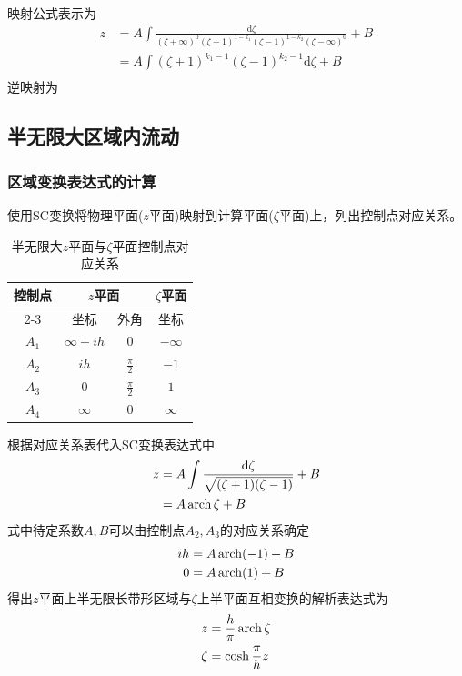 映射公式表示为
\begin{align}
    z&=A\int\frac{\mathrm{d}\zeta}{(\zeta+\infty)^{0}(\zeta+1)^{1-k_{1}}(\zeta-1)^{1-k_{2}}(\zeta-\infty)^{0}}+B\\
    &=A\int(\zeta+1)^{k_{1}-1}(\zeta-1)^{k_{2}-1}\mathrm{d}\zeta+B\\
\end{align}
逆映射为

\subsection{半无限大区域内流动}
\subsubsection{区域变换表达式的计算}
使用SC变换将物理平面($z$平面)映射到计算平面($\zeta$平面)上，列出控制点对应关系。
\begin{table}[htbp] 
    \centering
    \caption{半无限大$z$平面与$\zeta$平面控制点对应关系}
    \label{tab:optimized-mapping}
    \begin{tabular}{cccc}
        \toprule
        控制点 & \multicolumn{2}{c}{$z$平面} & $\zeta$平面 \\
        \cmidrule(lr){2-3} %
                         & 坐标 & 外角 & 坐标 \\
        \midrule
        $A_{1}$ & $\infty+ih$     & $0$                 & $-\infty$ \\
        $A_{2}$ & $ih$            & $\frac{\pi}{2}$       & $-1$      \\
        $A_{3}$ & $0$             & $\frac{\pi}{2}$       & $1$       \\
        $A_{4}$ & $\infty$        & $0$                 & $\infty$  \\
        \bottomrule
    \end{tabular}
\end{table}
根据对应关系表代入SC变换表达式中
\begin{align}
    z&=A\int \frac{\mathrm{d}\zeta}{\sqrt{(\zeta+1)(\zeta-1)}}+B\notag\\
    &=A\operatorname{arch} \zeta +B
\end{align}
式中待定系数$A,B$可以由控制点$A_{2},A_{3}$的对应关系确定
\begin{align}
    ih&=A\operatorname{arch}(-1)+B\\
    0&=A\operatorname{arch}(1)+B
\end{align}
得出$z$平面上半无限长带形区域与$\zeta$上半平面互相变换的解析表达式为
\begin{align}
    z&=\frac{h}{\pi}\operatorname{arch}\zeta\\
    \zeta&=\cosh\frac{\pi}{h}z
\end{align}

